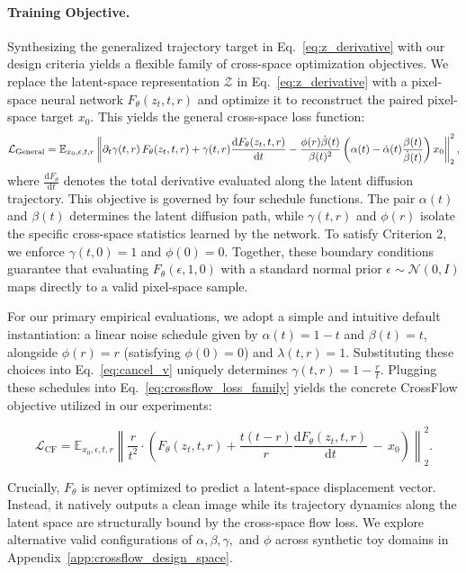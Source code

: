 \paragraph{Training Objective.}
Synthesizing the generalized trajectory target in Eq.~\eqref{eq:z_derivative} with our design criteria yields a flexible family of cross-space optimization objectives. We replace the latent-space representation $\mathcal{Z}$ in Eq.~\eqref{eq:z_derivative} with a pixel-space neural network $F_\theta(z_t,t,r)$ and optimize it to reconstruct the paired pixel-space target $x_0$. This yields the general cross-space loss function:
\begin{equation}
\small
\mathcal{L}_{\text{General}} = \mathbb{E}_{x_0,\epsilon,t,r} \left\| \partial_t \gamma(t,r)\, F_\theta(z_t,t,r) + \gamma(t,r)\frac{\mathrm{d} F_\theta(z_t,t,r)}{\mathrm{d}t} - \frac{\phi(r)\dot{\beta}(t)}{\beta(t)^2} \left( \alpha(t)-\dot{\alpha}(t)\frac{\beta(t)}{\dot{\beta}(t)} \right)x_0 \right\|_2^2,
\label{eq:crossflow_loss_family}
\end{equation}
where $\frac{\mathrm{d} F_\theta}{\mathrm{d}t}$ denotes the total derivative evaluated along the latent diffusion trajectory. This objective is governed by four schedule functions. The pair $\alpha(t)$ and $\beta(t)$ determines the latent diffusion path, while $\gamma(t,r)$ and $\phi(r)$ isolate the specific cross-space statistics learned by the network. To satisfy Criterion 2, we enforce $\gamma(t,0)=1$ and $\phi(0)=0$. Together, these boundary conditions guarantee that evaluating $F_\theta(\epsilon, 1, 0)$ with a standard normal prior $\epsilon \sim \mathcal{N}(0, I)$ maps directly to a valid pixel-space sample.

For our primary empirical evaluations, we adopt a simple and intuitive default instantiation: a linear noise schedule given by $\alpha(t)=1-t$ and $\beta(t)=t$, alongside $\phi(r)=r$ (satisfying $\phi(0)=0$) and $\lambda(t,r)=1$. Substituting these choices into Eq.~\eqref{eq:cancel_v} uniquely determines $\gamma(t,r)=1-\frac{r}{t}$. Plugging these schedules into Eq.~\eqref{eq:crossflow_loss_family} yields the concrete CrossFlow objective utilized in our experiments:

\begin{equation}
\mathcal{L}_{\mathrm{CF}} = \mathbb{E}_{x_0,\epsilon,t,r} \left\| \frac{r}{t^2} \cdot \left( F_\theta(z_t,t,r) + \frac{t(t-r)}{r} \frac{\mathrm{d} F_\theta(z_t,t,r)}{\mathrm{d}t} \, - \, x_0 \right) \right\|_2^2.
\label{eq:crossflow_loss}
\end{equation}

Crucially, $F_\theta$ is never optimized to predict a latent-space displacement vector. Instead, it natively outputs a clean image while its trajectory dynamics along the latent space are structurally bound by the cross-space flow loss. We explore alternative valid configurations of $\alpha, \beta, \gamma,$ and $\phi$ across synthetic toy domains in Appendix~\ref{app:crossflow_design_space}.
